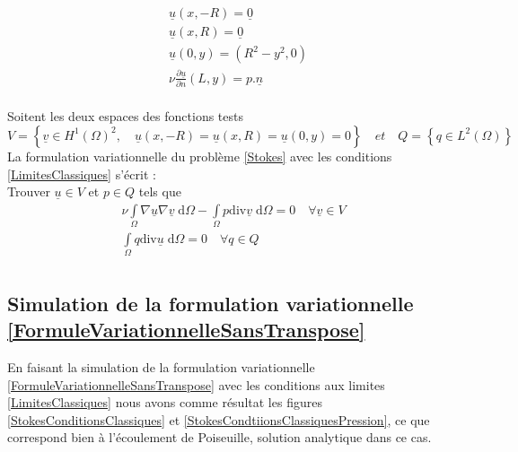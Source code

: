 \documentclass[11pt,a4paper]{article}
\numberwithin{equation}{subsection}
\numberwithin{figure}{subsection}
\begin{document}
\begin{equation}
\begin{aligned}
& \underline{u}(x,-R) = \underline{0} \\
& \underline{u}(x, R) = \underline{0} \\
& \underline{u}(0,y) = \left(R^2 - y^2, 0\right) \\
& \nu\frac{\partial\underline{u}}{\partial n}(L,y) = p.\underline{n}\\
\end{aligned} \label{LimitesClassiques}
\end{equation}

Soitent les deux espaces des fonctions tests\\
$V=\left\{\underline{v}\in H^1(\Omega)^2, \quad  \underline{u}(x,-R)=\underline{u}(x, R)=\underline{u}(0,y)=0\right\} \quad et \quad Q=\left\{q\in L^2(\Omega)\right\}$\\
La formulation variationnelle du problème \ref{Stokes} avec les conditions \ref{LimitesClassiques} s’écrit :\\
Trouver $\underline{u}\in V $ et $p \in Q $ tels que\\

\begin{equation}
\begin{aligned}
\nu \int\limits_\Omega \nabla \underline{u} \nabla \underline{v} \;\mathrm{d}\Omega - \int\limits_\Omega p \mathrm{div}  \underline{v} \; \mathrm{d}\Omega = 0 \quad \forall \underline{v}\in V\\
\int\limits_\Omega q \mathrm{div} \underline{u} \;\mathrm{d}\Omega = 0 \quad \forall q \in Q\\
\end{aligned}\label{FormuleVariationnelleSansTranspose}
\end{equation}

\subsection{Simulation de la formulation variationnelle \ref{FormuleVariationnelleSansTranspose}}

En faisant la simulation de la formulation variationnelle \ref{FormuleVariationnelleSansTranspose} avec les conditions aux limites \ref{LimitesClassiques} nous avons comme résultat les figures \ref{StokesConditionsClassiques} et \ref{StokesCondtiionsClassiquesPression}, ce que correspond bien à l'écoulement de Poiseuille, solution analytique dans ce cas.
\end{document}
